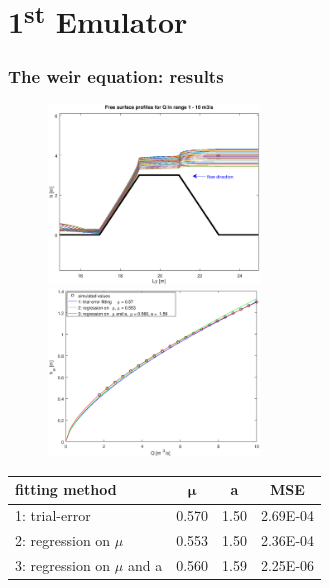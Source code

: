 \documentclass[xcolor=dvipsnames, USenglish]{beamer}  %
\begin{document}
\section{1\textsuperscript{st} Emulator}
  \begin{frame}
  
    \frametitle{The weir equation: results}
    \begin{figure}[t]
      \includegraphics[width=0.5\textwidth]{img/free_surfaces.eps}
      \includegraphics[width=0.5\textwidth]{img/points_interpolations.eps}
    \end{figure}

    \begin{table}
    \centering
       \begin{tabular}{lccc}
       \toprule
       \textbf{fitting method} & $\boldsymbol{\mu}$ &  \textbf{a} & \textbf{MSE}\\
       \midrule
       1: trial-error & 0.570 & 1.50 & 2.69E-04\\
       2: regression on $\mu$ & 0.553 & 1.50 & 2.36E-04\\
       3: regression on $\mu$ and a & 0.560 & 1.59 & 2.25E-06\\
       \bottomrule
       \end{tabular}
    \end{table}

  \end{frame}
\end{document}
